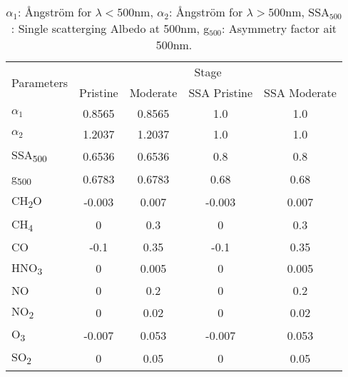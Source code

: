 \begin{table}[H]
    \centering
    \begin{tabular}{lcccc}
    \hline
    \multicolumn{1}{c}{\multirow{2}{*}{Parameters}} & \multicolumn{4}{c}{Stage}                         \\ \cline{2-5} 
    \multicolumn{1}{c}{}                            & Pristine & Moderate & SSA Pristine & SSA Moderate \\ \hline
    $\alpha_1$                                      & 0.8565   & 0.8565   & 1.0          & 1.0           \\
    $\alpha_2$                                      & 1.2037   & 1.2037   & 1.0          & 1.0           \\
    SSA\textsubscript{500}                          & 0.6536   & 0.6536   & 0.8          & 0.8          \\
    g\textsubscript{500}                            & 0.6783   & 0.6783   & 0.68         & 0.68         \\
    CH\textsubscript{2}O                            & -0.003   & 0.007    & -0.003       & 0.007        \\
    CH\textsubscript{4}                             & 0        & 0.3      & 0            & 0.3          \\
    CO                                              & -0.1     & 0.35     & -0.1         & 0.35         \\
    HNO\textsubscript{3}                            & 0        & 0.005    & 0            & 0.005        \\
    NO                                              & 0        & 0.2      & 0            & 0.2          \\
    NO\textsubscript{2}                             & 0        & 0.02     & 0            & 0.02         \\
    O\textsubscript{3}                              & -0.007   & 0.053    & -0.007       & 0.053        \\
    SO\textsubscript{2}                             & 0        & 0.05     & 0            & 0.05         \\ \hline
    \end{tabular}
    \caption{$\alpha_1$: \AA ngstr\"om for $\lambda<500$nm, 
    $\alpha_2$: \AA ngstr\"om  for $\lambda>500$nm, 
    SSA$_{500}$: Single scatterging Albedo at 500nm,
    g$_{500}$: Asymmetry factor ait 500nm.}
    \label{table:parameters}
\end{table}